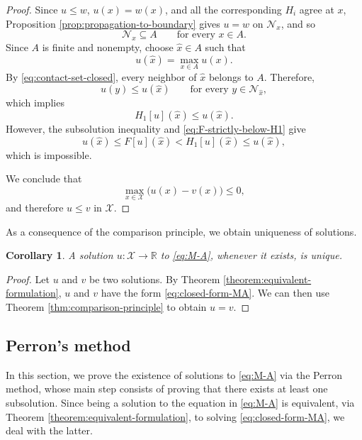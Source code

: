 \documentclass[reqno,11pt]{amsart}
\numberwithin{equation}{section}
\newtheorem{corollary}[theorem]{Corollary}
\theoremstyle{definition}
\theoremstyle{remark}
\begin{document}
\begin{proof}
Since \(u\leq w\), \(u(x)=w(x)\), and all the corresponding \(H_i\) agree at \(x\), Proposition \ref{prop:propagation-to-boundary} gives \(u=w\) on \(\mathcal N_x\), and so
\begin{equation}\label{eq:contact-set-closed}
    \mathcal N_x\subseteq A
    \qquad\text{for every }x\in A.
\end{equation}
Since \(A\) is finite and nonempty, choose
\(\widehat x\in A\) such that
\[
    u(\widehat x)=\max_{x\in A}u(x).
\]
By \eqref{eq:contact-set-closed}, every neighbor of \(\widehat x\)
belongs to \(A\). Therefore,
\[
    u(y)\leq u(\widehat x)
    \qquad\text{for every }y\in\mathcal N_{\widehat x},
\]
which implies
\[
    H_1[u](\widehat x)\leq u(\widehat x).
\]
However, the subsolution inequality and
\eqref{eq:F-strictly-below-H1} give
\[
    u(\widehat x)
    \leq
    F[u](\widehat x)
    <
    H_1[u](\widehat x)
    \leq
    u(\widehat x),
\]
which is impossible.

We conclude that
\[
    \max_{x\in\mathcal X}\bigl(u(x)-v(x)\bigr)\leq0,
\]
and therefore \(u\leq v\) in \(\mathcal X\).
\end{proof}

As a consequence of the comparison principle, we obtain uniqueness of solutions.

\begin{corollary}\label{cor:uniqueness-solutions}
A solution $u\colon \mathcal{X} \to \mathbb{R}$ to \eqref{eq:M-A}, whenever it exists, is unique.
\end{corollary}

\begin{proof}
Let \(u\) and \(v\) be two solutions. By Theorem \ref{theorem:equivalent-formulation}, $u$ and $v$ have the form \eqref{eq:closed-form-MA}. We can then use Theorem \ref{thm:comparison-principle} to obtain $u = v$.
\end{proof}

\subsection{Perron's method}

In this section, we prove the existence of solutions to \eqref{eq:M-A} via the Perron method, whose main step consists of proving that there exists at least one subsolution. Since being a solution to the equation in \eqref{eq:M-A} is equivalent, via Theorem \ref{theorem:equivalent-formulation}, to solving \eqref{eq:closed-form-MA}, we deal with the latter.
\end{document}

